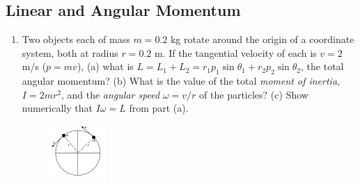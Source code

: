 \documentclass[10pt]{article}
\begin{document}
\subsection{Linear and Angular Momentum}
\begin{enumerate}
\item Two objects each of mass $m = 0.2$ kg rotate around the origin of a coordinate system, both at radius $r = 0.2$ m.  If the tangential velocity of each is $v = 2$ m/s ($p = mv$), (a) what is $L = L_1 + L_2 = r_1 p_1\sin\theta_1+r_2 p_2\sin\theta_2$, the total angular momentum?  (b) What is the value of the total \textit{moment of inertia}, $I = 2mr^2$, and the \textit{angular speed} $\omega = v/r$ of the particles?  (c) Show numerically that $I\omega = L$ from part (a).
\begin{figure}[hb]
\centering
\includegraphics[width=0.2\textwidth]{rotate.pdf}
\end{figure}
\end{enumerate}
\end{document}

